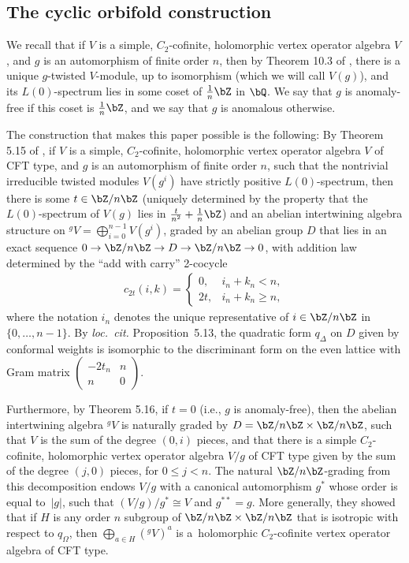 \subsection{The cyclic orbifold construction}

We recall that if $V$ is a simple, $C_2$-cofinite, holomorphic vertex operator algebra $V$, and $g$ is an automorphism of finite order $n$, then by Theorem 10.3 of \cite{DLM97}, there is a unique $g$-twisted $V$-module, up to isomorphism (which we will call $V(g)$), and its $L(0)$-spectrum lies in some coset of $\frac{1}{n}\bZ$ in $\bQ$. We say that $g$ is anomaly-free if this coset is $\frac{1}{n}\bZ$, and we say that $g$ is anomalous otherwise.

The construction that makes this paper possible is the following: By Theorem 5.15 of \cite{vEMS}, if $V$ is a simple, $C_2$-cofinite, holomorphic vertex operator algebra $V$ of CFT type, and $g$ is an automorphism of finite order $n$, such that the nontrivial irreducible twisted modules $V(g^i)$ have strictly positive $L(0)$-spectrum, then there is some $t \in \bZ/n\bZ$ (uniquely determined by the property that the $L(0)$-spectrum of $V(g)$ lies in $\frac{t}{n^2} + \frac{1}{n}\bZ$) and an abelian intertwining algebra structure on ${}^gV = \bigoplus_{i=0}^{n-1} V(g^i)$, graded by an abelian group $D$ that lies in an exact sequence $0 \to \bZ/n\bZ \to D \to \bZ/n\bZ \to 0$, with addition law determined by the ``add with carry'' 2-cocycle
\begin{gather*} c_{2t}(i,k) = \begin{cases} 0, & i_n + k_n < n, \\ 2t, & i_n + k_n \geq n, \end{cases} \end{gather*}
where the notation $i_n$ denotes the unique representative of $i \in \bZ/n\bZ$ in $\{0,\ldots,n-1\}$. By \textit{loc.\ cit.} Proposition~5.13, the quadratic form $q_\Delta$ on $D$ given by conformal weights is isomorphic to the discriminant form on the even lattice with Gram matrix $\left( \begin{smallmatrix} -2t_n & n \\ n & 0 \end{smallmatrix} \right)$.

Furthermore, by Theorem 5.16, if $t=0$ (i.e., $g$ is anomaly-free), then the abelian intertwining algebra ${}^gV$ is naturally graded by $D = \bZ/n\bZ \times \bZ/n\bZ$, such that $V$ is the sum of the degree $(0,i)$ pieces, and that there is a simple $C_2$-cofinite, holomorphic vertex operator algebra $V/g$ of CFT type given by the sum of the degree $(j,0)$ pieces, for $0 \leq j < n$. The natural $\bZ/n\bZ$-grading from this decomposition endows $V/g$ with a canonical automorphism $g^*$ whose order is equal to~$|g|$, such that $(V/g)/g^* \cong V$ and $g^{**} = g$. More generally, they showed that if $H$ is any order $n$ subgroup of $\bZ/n\bZ \times \bZ/n\bZ$ that is isotropic with respect to $q_\Omega$, then $\bigoplus_{a \in H} ({}^gV)^a$ is a~holomorphic $C_2$-cofinite vertex operator algebra of CFT type.


